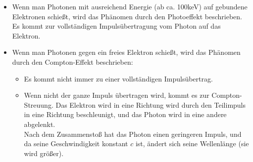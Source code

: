 \begin{itemize}
\item Wenn man Photonen mit ausreichend Energie (ab ca. 100keV) auf gebundene Elektronen schießt, wird das Phänomen durch den Photoeffekt beschrieben. Es kommt zur vollständigen Impulsübertragung vom Photon auf das Elektron.
\item Wenn man Photonen gegen ein freies Elektron schießt, wird das Phänomen durch den Compton-Effekt beschrieben:
\begin{itemize}
\item Es kommt nicht immer zu einer vollständigen Impulsübertrag.
\item Wenn nicht der ganze Impuls übertragen wird, kommt es zur Compton-Streuung.
Das Elektron wird in eine Richtung wird durch den Teilimpuls in eine Richtung beschleunigt, und das Photon wird in eine andere abgelenkt.\\
Nach dem Zusammenstoß hat das Photon einen geringeren Impuls, und da seine Geschwindigkeit konstant $c$ ist, ändert sich seine Wellenlänge (sie wird größer).
\begin{comment}\item Durch den Impulserhaltungssatz gilt:\\
Vor Kollision:\\
$p_{gesamt} = p_{Phot} \rightarrow p_{gesamt}=\frac{h}{\lambda}$


Nach Kollision: \\
$p_{gesamt} = p'_{phot} + p_e$

$\frac{h}{\lambda} = \frac{h}{\lambda'} + m_e \cdot v$

$\frac{h}{\lambda} = \frac{h}{\lambda} \cdot \cos{\Theta} + \frac{h}{\lambda} \cdot (1-\cos{\Theta})$ \tabto{0.5\textwidth} ; $c = \lambda * f \rightarrow \lambda = c / f$

$\frac{h}{\lambda} = \frac{h}{\lambda} \cdot \cos{\Theta} + \frac{h}{\lambda} \cdot (1-\cos{\Theta})$





$m_e \cdot v = \frac{h}{\lambda}$ \tabto{0.5\textwidth} ; umstellen nach $\lambda$ 


$\lambda' = \lambda + \Delta\lambda$

$\lambda' - \lambda = \Delta\lambda$

$\lambda' - \lambda = $


$\lambda = \frac{h}{m_e \cdot v}$

\end{comment}


\end{itemize}
\end{itemize}
